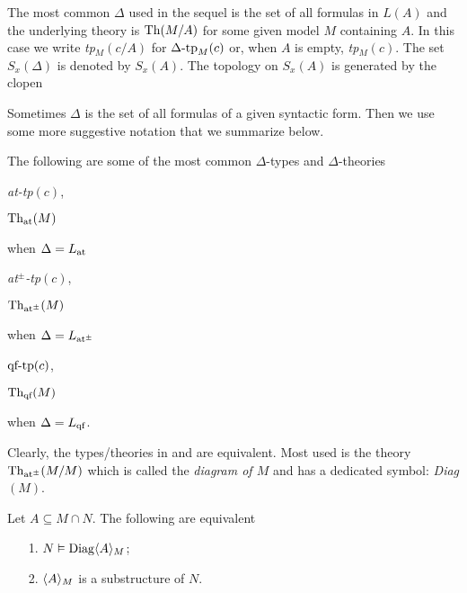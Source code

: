 \documentclass[creche.tex]{subfiles}
\begin{document}
The most common $\Delta$ used in the sequel is the set of all formulas in $L(A)$ and the underlying theory is $\textrm{Th}(M/A)$ for some given model $M$ containing $A$.
In this case we write \emph{tp$_M(c/A)$} for $\Delta\mbox{-}\textrm{tp}_M(c)$ or, when $A$ is empty, \emph{tp$_M(c)$}.
The set $S_x(\Delta)$ is denoted by $S_x(A)$.
The topology on  $S_x(A)$ is generated by the clopen


Sometimes $\Delta$ is the set of all formulas of a given syntactic form.
Then we use some more suggestive notation that we summarize below.

\begin{notation}\label{note_tipi_diagramma}
The following are some of the most common $\Delta$-types and $\Delta$-theories
\def\ceq#1#2{\parbox[b]{15ex}{#1}\parbox[b]{14ex}{\hfill #2}}


\ceq{\hfill\emph{\textrm{at-tp}$(c)$},}{\emph{$\textrm{Th}_{\textrm{\scriptsize at}}(M)$\/}}\qquad when $\Delta=L_{\tiny\rm at}\hskip-.3ex$

\ceq{\hfill\emph{\textrm{at$^\pm$-tp}$(c)$},}{\emph{$\textrm{Th}_{\textrm{\scriptsize at}^\pm}(M)$\/}}\qquad when $\Delta=L_{{\tiny\rm at^\pm}}\hskip-.3ex$

\ceq{\hfill\emph{$\textrm{qf\mbox{-}tp}(c)$},}{\emph{$\textrm{Th}_{\textrm{\scriptsize qf}}(M)$\/}}\qquad when $\Delta=L_{\rm qf}$.

Clearly, the types/theories in  and  are equivalent.
Most used is the theory $\textrm{Th}_{\textrm{\scriptsize at}^\pm}(M/M)$ which is called the \emph{diagram of $M$\/} and has a dedicated symbol: \emph{Diag$(M)$}.\QED
\end{notation}

\begin{remark}\label{rem_diagram}
Let $A\subseteq M\cap N$.
The following are equivalent
\begin{itemize}
\item[1.] $N\vDash{\rm Diag}\langle A\rangle_M$;
\item[2.] $\langle A\rangle_M$ is a substructure of $N$.\QED
\end{itemize}
\end{remark}


\end{document}
